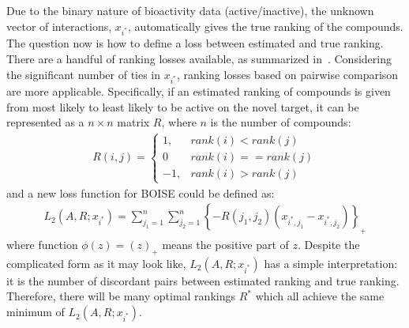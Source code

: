 \documentclass[11pt,a4paper]{article}
\theoremstyle{plain}
\begin{document}
Due to the binary nature of bioactivity data (active/inactive), the unknown vector of interactions, $x_{i^*}$, automatically gives the true ranking of the compounds. 
The question now is how to define a loss between estimated and true ranking. 
There are a handful of ranking losses available, as summarized in~\cite{NIPS2009_chen}. 
Considering the significant number of ties in $x_{i^*}$, ranking losses based on pairwise comparison are more applicable. 
Specifically, if an estimated ranking of compounds is given from most likely to least likely to be active on the novel target, it can be represented as a $n\times n$ matrix $R$, where $n$ is the number of compounds:
\begin{eqnarray}
\label{eq:rank_matrix}
R(i,j) = \begin{cases}
  1,  &  rank(i) < rank(j) \\
  0 & rank(i) == rank(j)\\
 -1,  &  rank(i) > rank(j)
\end{cases}
\end{eqnarray}
and a new loss function for BOISE could be defined as:
\begin{eqnarray}
\label{eq:new_loss_rank}
L_2(A, R;x_{i^*}) = \sum_{j_1=1}^n\sum_{j_2=1}^n \left\{-R(j_1, j_2)(x_{i^*,j_1} - x_{i^*,j_2})\right\}_+
\end{eqnarray}
where function $\phi(z) = (z)_+$ means the positive part of $z$. Despite the complicated form as it may look like, $L_2(A,R;x_{i^*})$ has a simple interpretation: it is the number of discordant pairs between estimated ranking and true ranking. %
Therefore, there will be many optimal rankings $R^*$ which all achieve the same minimum of $L_2(A, R;x_{i^*})$. 

\end{document}
